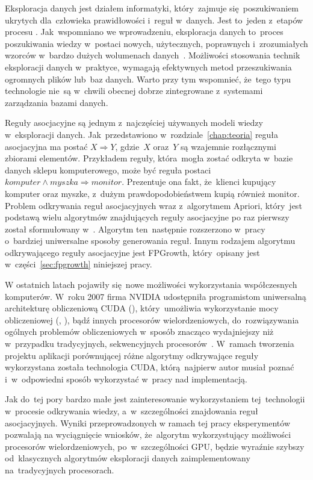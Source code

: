 Eksploracja danych jest działem informatyki, który~zajmuje się~poszukiwaniem ukrytych dla~człowieka prawidłowości i~reguł w~danych. Jest to~jeden z~etapów procesu . Jak~wspomniano we wprowadzeniu, eksploracja danych to~proces poszukiwania wiedzy w~postaci nowych, użytecznych, poprawnych i~zrozumiałych wzorców w~bardzo dużych wolumenach danych~\cite{DataMiningStart}. Możliwości stosowania technik eksploracji danych w~praktyce, wymagają efektywnych metod przeszukiwania ogromnych plików lub~baz danych. Warto przy tym wspomnieć, że~tego typu technologie nie~są w~chwili obecnej dobrze zintegrowane z~systemami zarządzania bazami danych.

Reguły asocjacyjne są jednym z~najczęściej używanych modeli wiedzy w~eksploracji danych. Jak~przedstawiono w~rozdziale~\ref{chap:teoria} reguła asocjacyjna ma postać $X \Rightarrow Y$, gdzie~$X$ oraz~$Y$ są wzajemnie rozłącznymi zbiorami elementów. Przykładem reguły, która~mogła zostać odkryta w~bazie danych sklepu komputerowego, może być reguła postaci $komputer \land myszka \Rightarrow monitor$. Prezentuje ona fakt, że~klienci kupujący komputer oraz myszke, z~dużym prawdopodobieństwem kupią również monitor. Problem odkrywania reguł asocjacyjnych wraz z~algorytmem Apriori, który~jest podstawą wielu algorytmów znajdujących reguły asocjacyjne po raz pierwszy został sformułowany w~\cite{Problem:Statement}. Algorytm ten~następnie rozszerzono w~pracy~\cite{AssRulesStrt} o~bardziej uniwersalne sposoby generowania reguł. Innym rodzajem algorytmu odkrywającego reguły asocjacyjne jest FPGrowth, który~opisany jest w~części~\ref{sec:fpgrowth} niniejszej pracy.

W ostatnich latach pojawiły się~nowe możliwości wykorzystania współczesnych komputerów. W~roku 2007 firma NVIDIA udostępniła programistom uniwersalną architekturę obliczeniową CUDA (), który~umożliwia wykorzystanie mocy obliczeniowej  (, ), bądź innych procesorów wielordzeniowych, do~rozwiązywania ogólnych problemów obliczeniowych w~sposób znacząco wydajniejszy niż w~przypadku tradycyjnych, sekwencyjnych procesorów~\cite{cuda:zone}. W~ramach tworzenia projektu aplikacji porównującej różne algorytmy odkrywające reguły wykorzystana została technologia CUDA, którą~najpierw autor musiał poznać i~w~odpowiedni sposób wykorzystać w~pracy nad implementacją.

Jak do~tej pory bardzo małe jest zainteresowanie wykorzystaniem tej~technologii w~procesie odkrywania wiedzy, a~w~szczególności znajdowania reguł asocjacyjnych. Wyniki przeprowadzonych w ramach tej pracy eksperymentów pozwalają na wyciągnięcie wniosków, że~algorytm wykorzystujący możliwości procesorów wielordzeniowych, po~w~szczególności GPU, będzie wyraźnie szybszy od~klasycznych algorytmów eksploracji danych zaimplementowany na~tradycyjnych procesorach. 


